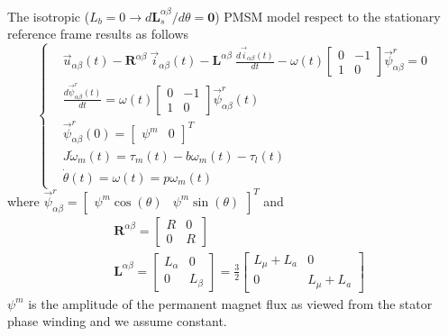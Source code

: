 \documentclass[12pt,a4paper]{scrartcl}
\begin{document}
\begin{onehalfspace}
\begin{mybox}
	The isotropic ($L_b=0 \rightarrow d\mathbf{L}_s^{\alpha\beta}/d\theta=\mathbf{0}$) PMSM model respect to the stationary reference frame results as follows
	\begin{equation}\label{twophase_eq1tris}
		\left\lbrace \begin{aligned}
			& \vec{u}_{\alpha\beta}(t)-\mathbf{R}^{\alpha\beta}\ \vec{i}_{\alpha\beta}(t)-\mathbf{L}^{\alpha\beta}\ \frac{d\vec{i}_{\alpha\beta}(t)}{dt}-\omega(t) \begin{bmatrix} 0 & -1 \\ 1 & 0\end{bmatrix} \vec{\psi}^r_{\alpha\beta} = 0 \\[6pt]
			& \frac{d\vec{\psi}^r_{\alpha\beta}(t)}{dt} = \omega(t) \begin{bmatrix} 0 & -1 \\ 1 & 0\end{bmatrix} \vec{\psi}^r_{\alpha\beta}(t) \\[6pt]
			& \vec{\psi}^r_{\alpha\beta}(0) = \begin{bmatrix} \psi^m &  0 \end{bmatrix}^T \\[6pt]
			& J\dot{\omega}_m(t) = \tau_m(t)-b{\omega}_m(t)-\tau_l(t) \\[6pt]
			& \dot{\theta}(t) = \omega(t) = p\omega_m(t)
		\end{aligned} \right. 
	\end{equation}
	where $\vec{\psi}^r_{\alpha\beta} = \begin{bmatrix} \psi^m\cos(\theta) &  \psi^m\sin(\theta)\end{bmatrix}^T$ and
	\begin{equation*}
		\begin{aligned}
			& \mathbf{R}^{\alpha\beta} = 
			\begin{bmatrix} R &  0 \\
				0 & R
			\end{bmatrix} \\[6pt]
			& \mathbf{L}^{\alpha\beta} = 
			\begin{bmatrix} L_{\alpha} &  0 \\
				0 & L_{\beta}
			\end{bmatrix} = \frac{3}{2}
			\begin{bmatrix} L_\mu+L_a &  0 \\
				0 & L_\mu+L_a
			\end{bmatrix}
		\end{aligned} 
	\end{equation*}
	$\psi^m$ is the amplitude of the permanent magnet flux as viewed from the stator phase winding and we assume constant.
\end{mybox}


\end{onehalfspace}
\end{document}
